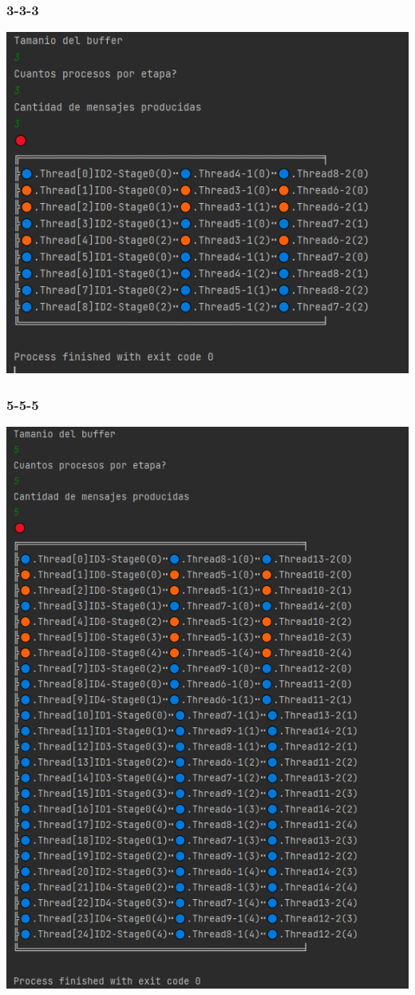 \documentclass[a4paper]{article}
\begin{document}
    \subsubsection{3-3-3}
    \includegraphics{3-3-3.PNG}

    \subsubsection{5-5-5}
    \includegraphics{5-5-5.PNG}
\end{document}
